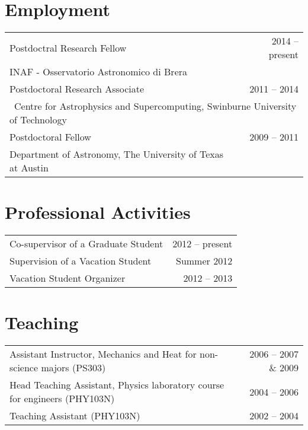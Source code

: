 \section*{Employment}

\hspace{0.05in}
\begin{tabular*}{159.2mm}{@{\extracolsep{\fill}}lr}
  Postdoctral Research Fellow & 2014 -- present\\
  \quad INAF - Osservatorio Astronomico di Brera\\
  Postdoctoral Research Associate & 2011 -- 2014\\
  \multicolumn{2}{l}{\, Centre for Astrophysics and Supercomputing, Swinburne University of Technology}\\
  Postdoctoral Fellow & 2009 -- 2011\\
  \quad Department of Astronomy, The University of Texas at Austin
\end{tabular*}

\section*{Professional Activities}

\hspace{0.05in}
\begin{tabular*}{159.2mm}{@{\extracolsep{\fill}}lr}
Co-supervisor of a Graduate Student & 2012 -- present\\
Supervision of a Vacation Student & Summer 2012\\
Vacation Student Organizer & 2012 -- 2013\\
\end{tabular*}

\section*{Teaching}

\hspace{0.05in}
\begin{tabular*}{159.2mm}{@{\extracolsep{\fill}}lr}
  Assistant Instructor, Mechanics and Heat for non-science majors (PS303) & 2006 -- 2007 \& 2009\\
  Head Teaching Assistant, Physics laboratory course for engineers (PHY103N) & 2004 -- 2006\\
  Teaching Assistant (PHY103N) & 2002 -- 2004
\end{tabular*}

